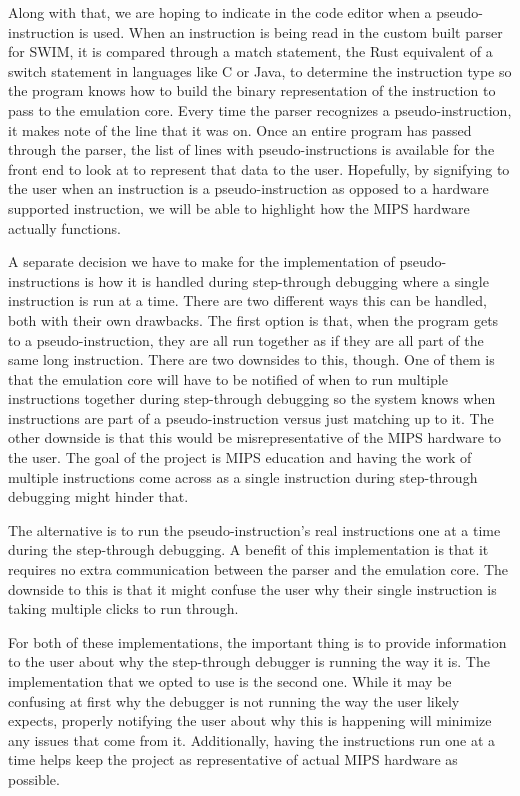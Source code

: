 \documentclass[
    parskip=half,
    fontsize=12pt,
    titlepage=firstiscover,
    toc=bibliography,
    numbers=endperiod
]{scrartcl}
\begin{document}
Along with that, we are hoping to indicate in the code editor when a
pseudo-instruction is used. When an instruction is being read in the
custom built parser for SWIM, it is compared through a match statement,
the Rust equivalent of a switch statement in languages like C or Java,
to determine the instruction type so the program knows how to build the
binary representation of the instruction to pass to the emulation core.
Every time the parser recognizes a pseudo-instruction, it makes note of
the line that it was on. Once an entire program has passed through the
parser, the list of lines with pseudo-instructions is available for the
front end to look at to represent that data to the user. Hopefully, by
signifying to the user when an instruction is a pseudo-instruction as
opposed to a hardware supported instruction, we will be able to
highlight how the MIPS hardware actually functions.

A separate decision we have to make for the implementation of
pseudo-instructions is how it is handled during step-through debugging
where a single instruction is run at a time. There are two different
ways this can be handled, both with their own drawbacks. The first option
is that, when the program gets to a pseudo-instruction, they are all run
together as if they are all part of the same long instruction. There are
two downsides to this, though. One of them is that the emulation core
will have to be notified of when to run multiple instructions together
during step-through debugging so the system knows when instructions are
part of a pseudo-instruction versus just matching up to it. The other
downside is that this would be misrepresentative of the MIPS hardware to
the user. The goal of the project is MIPS education and having the work
of multiple instructions come across as a single instruction during
step-through debugging might hinder that.

The alternative is to run the pseudo-instruction's real instructions one
at a time during the step-through debugging. A benefit of this
implementation is that it requires no extra communication between the
parser and the emulation core. The downside to this is that it might
confuse the user why their single instruction is taking multiple clicks
to run through.

For both of these implementations, the important thing is to provide
information to the user about why the step-through debugger is running
the way it is. The implementation that we opted to use is the second
one. While it may be confusing at first why the debugger is not running
the way the user likely expects, properly notifying the user about why
this is happening will minimize any issues that come from it.
Additionally, having the instructions run one at a time helps keep the
project as representative of actual MIPS hardware as possible.
\end{document}
